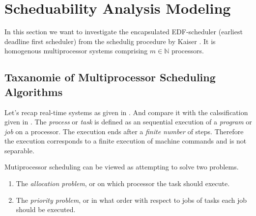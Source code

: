\section{Scheduability Analysis Modeling}









In this section we want to investigate the encapsulated EDF-scheduler (earliest deadline first scheduler) from the schedulig procedure by Kaiser \cite{K}. It is homogenous multiprocessor systems comprising $m\in \mathbb{N}$ processors.\\

\subsection{Taxanomie of Multiprocessor Scheduling Algorithms}

Let's recap \glspl{real-time system} as given in \cite{KBK}.
And compare it with the calssification given in \cite[section 2.3]{DB2011}.
The {\itshape process} or {\itshape task} is defined as an sequential execution of a {\itshape program}  or {\itshape job} on a processor.
The execution ends after a \emph{finite number} of steps.
Therefore the execution corresponds to a finite execution of machine commands and is not separable.\\

\begin{remark}
	\label{remark:problems}
	Mutiprocessor scheduling can be viewed as attempting  to solve two problems.
	\begin{enumerate}[label=(\roman*)]
		\item The \emph{allocation problem}, or on which processor the task should execute.
		\label{remark:allocationproblem}
		\item The \emph{priority problem}, or in what order with respect to jobs of tasks each job should be executed.
		\label{remark:priorityproblem}
	\end{enumerate}
\end{remark}

